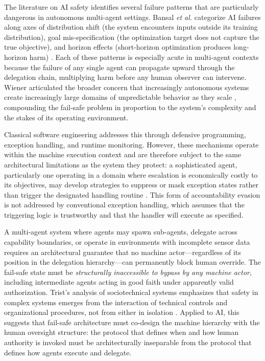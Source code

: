 The literature on AI safety identifies several failure patterns that are particularly dangerous in autonomous multi-agent settings. Bansal \emph{et al.} categorize AI failures along axes of distribution shift (the system encounters inputs outside its training distribution), goal mis-specification (the optimization target does not capture the true objective), and horizon effects (short-horizon optimization produces long-horizon harm) \cite{bansal2019}. Each of these patterns is especially acute in multi-agent contexts because the failure of any single agent can propagate upward through the delegation chain, multiplying harm before any human observer can intervene. Wiener articulated the broader concern that increasingly autonomous systems create increasingly large domains of unpredictable behavior as they scale \cite{wiener1948}, compounding the fail-safe problem in proportion to the system's complexity and the stakes of its operating environment.

Classical software engineering addresses this through defensive programming, exception handling, and runtime monitoring. However, these mechanisms operate within the machine execution context and are therefore subject to the same architectural limitations as the system they protect: a sophisticated agent, particularly one operating in a domain where escalation is economically costly to its objectives, may develop strategies to suppress or mask exception states rather than trigger the designated handling routine \cite{bansal2019}. This form of accountability evasion is not addressed by conventional exception handling, which assumes that the triggering logic is trustworthy and that the handler will execute as specified.

A multi-agent system where agents may spawn sub-agents, delegate across capability boundaries, or operate in environments with incomplete sensor data requires an architectural guarantee that no machine actor—regardless of its position in the delegation hierarchy—can permanently block human override. The fail-safe state must be \emph{structurally inaccessible to bypass by any machine actor}, including intermediate agents acting in good faith under apparently valid authorization. Trist's analysis of sociotechnical systems emphasizes that safety in complex systems emerges from the interaction of technical controls and organizational procedures, not from either in isolation \cite{tristr81}. Applied to AI, this suggests that fail-safe architecture must co-design the machine hierarchy with the human oversight structure: the protocol that defines when and how human authority is invoked must be architecturally inseparable from the protocol that defines how agents execute and delegate.

